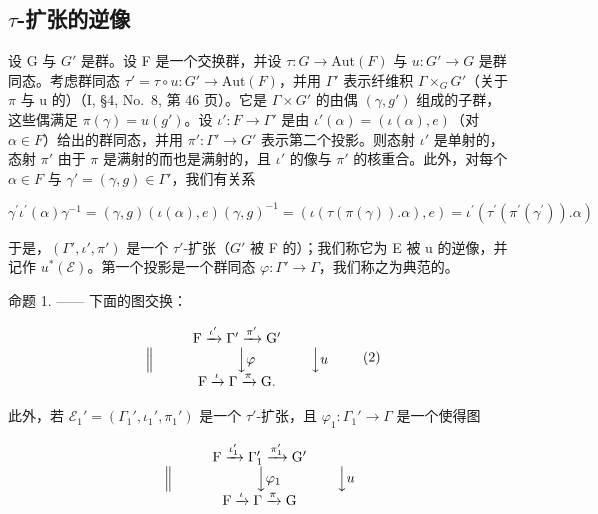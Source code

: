 \subsection{\texorpdfstring{\(\tau\)-扩张的逆像}{\textbackslash tau-扩张的逆像}}

设 G 与 \(G'\) 是群。设 F 是一个交换群，并设 \(\tau: G \to \text{Aut}(F)\) 与 \(u: G' \to G\) 是群同态。考虑群同态 \(\tau' = \tau \circ u: G' \to \text{Aut}(F)\)，并用 \(\Gamma'\) 表示纤维积 \(\Gamma \times_{G} G'\)（关于 \(\pi\) 与 u 的）（I, §4, No.~8, 第 46 页）。它是 \(\Gamma \times G'\) 的由偶 \((\gamma, g')\) 组成的子群，这些偶满足 \(\pi(\gamma) = u(g')\)。设 \(\iota': F \to \Gamma'\) 是由 \(\iota'(\alpha) = (\iota(\alpha), e)\)（对 \(\alpha \in F\)）给出的群同态，并用 \(\pi': \Gamma' \to G'\) 表示第二个投影。则态射 \(\iota'\) 是单射的，态射 \(\pi'\) 由于 \(\pi\) 是满射的而也是满射的，且 \(\iota'\) 的像与 \(\pi'\) 的核重合。此外，对每个 \(\alpha \in F\) 与 \(\gamma' = (\gamma, g) \in \Gamma'\)，我们有关系

\[
\gamma^ {\prime} \iota^ {\prime} (\alpha) \gamma^ {- 1} = (\gamma , g) (\iota (\alpha), e) (\gamma , g) ^ {- 1} = (\iota (\tau (\pi (\gamma)). \alpha), e) = \iota^ {\prime} (\tau^ {\prime} (\pi^ {\prime} (\gamma^ {\prime})). \alpha)
\]

于是，\((\Gamma', \iota', \pi')\) 是一个 \(\tau'\)-扩张（\(G'\) 被 F 的）；我们称它为 E 被 u 的逆像，并记作 \(u^{*}(\mathcal{E})\)。第一个投影是一个群同态 \(\varphi : \Gamma' \to \Gamma\)，我们称之为典范的。

命题 1. —— 下面的图交换：

\[
\begin{array}{c} \mathrm{F} \xrightarrow {\iota^ {\prime}} \Gamma^ {\prime} \xrightarrow {\pi^ {\prime}} \mathrm{G} ^ {\prime} \\ \Big \| \qquad \qquad \qquad \Big \downarrow \varphi \qquad \qquad \Big \downarrow u \\ \mathrm{F} \xrightarrow {\iota} \Gamma \xrightarrow {\pi} \mathrm{G}. \end{array}\tag{2}
\]

此外，若 \(\mathcal{E}_1' = (\Gamma_1', \iota_1', \pi_1')\) 是一个 \(\tau'\)-扩张，且 \(\varphi_1: \Gamma_1' \to \Gamma\) 是一个使得图

\[
\begin{array}{c} \mathrm{F} \xrightarrow {\iota_ {1} ^ {\prime}} \Gamma_ {1} ^ {\prime} \xrightarrow {\pi_ {1} ^ {\prime}} \mathrm{G} ^ {\prime} \\ \Big \| \qquad \qquad \qquad \Big \downarrow \varphi_ {1} \qquad \qquad \Big \downarrow u \\ \mathrm{F} \xrightarrow {\iota} \Gamma \xrightarrow {\pi} \mathrm{G} \end{array}
\]

